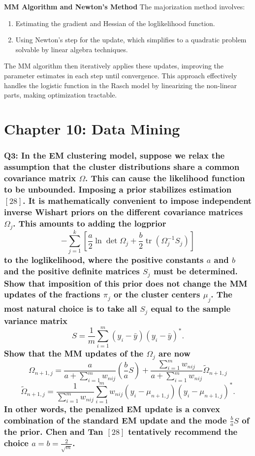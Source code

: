 \documentclass[8pt]{article}
\begin{document}
{\textbf{MM Algorithm and Newton's Method}
The majorization method involves:
\begin{enumerate}
    \item Estimating the gradient and Hessian of the loglikelihood function.
    \item Using Newton’s step for the update, which simplifies to a quadratic problem solvable by linear algebra techniques.
\end{enumerate}

The MM algorithm then iteratively applies these updates, improving the parameter estimates in each step until convergence. This approach effectively handles the logistic function in the Rasch model by linearizing the non-linear parts, making optimization tractable.

\newpage
\section*{Chapter 10: Data Mining}

\subsubsection*{Q3: In the EM clustering model, suppose we relax the assumption that the cluster distributions share a common covariance matrix \(\Omega\). This can cause the likelihood function to be unbounded. Imposing a prior stabilizes estimation \([28]\). It is mathematically convenient to impose independent inverse Wishart priors on the different covariance matrices \(\Omega_j\). This amounts to adding the logprior
\[
- \sum_{j=1}^{k} \left[ \frac{a}{2} \ln \det \Omega_j + \frac{b}{2} \operatorname{tr}(\Omega_j^{-1} S_j) \right]
\]
to the loglikelihood, where the positive constants \(a\) and \(b\) and the positive definite matrices \(S_j\) must be determined. Show that imposition of this prior does not change the MM updates of the fractions \(\pi_j\) or the cluster centers \(\mu_j\). The most natural choice is to take all \(S_j\) equal to the sample variance matrix
\[
S = \frac{1}{m} \sum_{i=1}^{m} (y_i - \bar{y})(y_i - \bar{y})^*.
\]
Show that the MM updates of the \(\Omega_j\) are now
\[
\Omega_{n+1,j} = \frac{a}{a + \sum_{i=1}^{m} w_{nij}} \left( \frac{b}{a} S \right) + \frac{\sum_{i=1}^{m} w_{nij}}{a + \sum_{i=1}^{m} w_{nij}} \tilde{\Omega}_{n+1,j}
\]
\[
\tilde{\Omega}_{n+1,j} = \frac{1}{\sum_{i=1}^{m} w_{nij}} \sum_{i=1}^{m} w_{nij} (y_i - \mu_{n+1,j})(y_i - \mu_{n+1,j})^*.
\]
In other words, the penalized EM update is a convex combination of the standard EM update and the mode \(\frac{b}{a} S\) of the prior. Chen and Tan \([28]\) tentatively recommend the choice \(a = b = \frac{2}{\sqrt{m}}\).}

}
\end{document}
